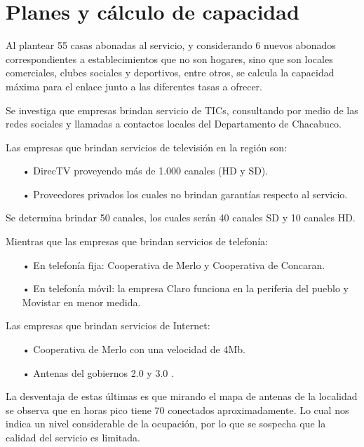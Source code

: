 \section{Planes y cálculo de capacidad}


Al plantear 55 casas abonadas al servicio, y considerando 6 nuevos abonados correspondientes a establecimientos que no son hogares, sino que son locales comerciales, clubes sociales y deportivos, entre otros, se calcula la capacidad máxima para el enlace junto a las diferentes tasas a ofrecer.

Se investiga que empresas brindan servicio de TICs, consultando por medio de las redes sociales y llamadas a contactos locales del Departamento de Chacabuco. 

Las empresas que brindan servicios de televisión en la región son:
\begin{itemize}
\item[•]DirecTV proveyendo más de 1.000 canales (HD y SD).
\item[•]Proveedores privados los cuales no brindan garantías respecto al servicio.
\end{itemize}

Se determina brindar 50 canales,  los cuales serán 40 canales SD y 10 canales HD. 

Mientras que las empresas que brindan servicios de telefonía: 

\begin{itemize}
\item[•]En telefonía fija: Cooperativa de Merlo y Cooperativa de Concaran.
\item[•]En telefonía móvil: la empresa Claro funciona en la periferia del pueblo y Movistar en menor medida. 
\end{itemize}



Las empresas que brindan servicios de Internet:
\begin{itemize}
\item[•]Cooperativa de Merlo con una velocidad de 4Mb.
\item[•]Antenas del gobiernos 2.0 y 3.0 .
\end{itemize}
La desventaja de estas últimas es que mirando el mapa de antenas de la localidad se observa que en horas pico tiene 70 conectados aproximadamente. Lo cual nos indica un nivel considerable de la ocupación, por lo que se sospecha que la calidad del servicio es limitada.

